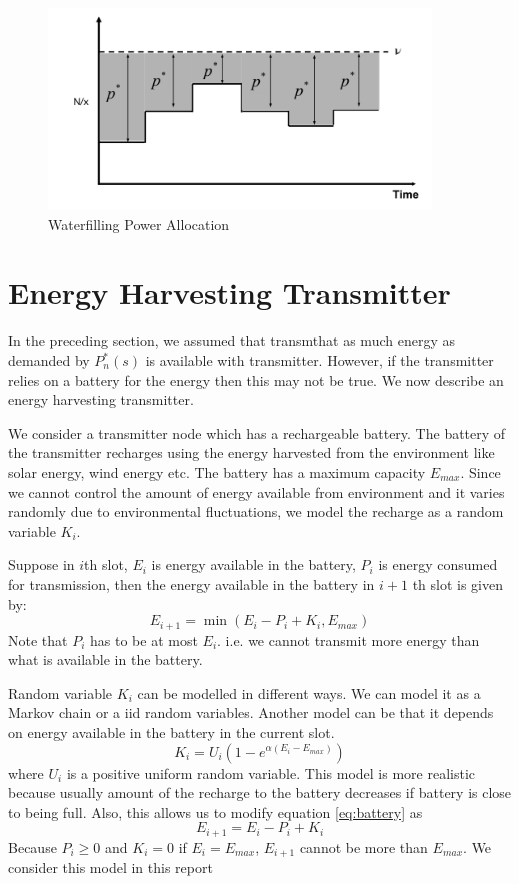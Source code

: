 \documentclass[a4paper,11pt]{article}
\begin{document}
\begin{figure}
\centering
\includegraphics[width = 4in]{waterfilling.png}
\caption{Waterfilling Power Allocation}
\label{fig:water}
\end{figure}

\section{Energy Harvesting Transmitter}
In the preceding section, we assumed that transmthat as much energy as demanded by $P_n^*(s)$ is available with transmitter. However, if the transmitter relies on a battery for the energy then this may not be true. We now describe an energy harvesting transmitter.

We consider a transmitter node which has a rechargeable battery. The battery of the transmitter recharges using the energy harvested from the environment like solar energy, wind energy etc. The battery has a maximum capacity $E_{max}$.
Since we cannot control the amount of energy available from environment and it varies randomly
due to environmental fluctuations, we model the recharge as a random variable $K_i$.

Suppose in $i$th slot, $E_i$ is energy available in the battery, $P_i$ is energy consumed for transmission, then the energy available in the battery in $i+1$ th slot is given by:
\begin{equation}
 E_{i+1} = \min(E_i - P_i + K_i,E_{max}) 
\label{eq:battery}
\end{equation}
Note that $P_i$ has to be at most $E_i$. i.e. we cannot transmit more energy than what is available in the battery.

Random variable $K_i$ can be modelled in different ways. We can model it as a Markov chain or a iid random variables.
Another model can be that it depends on energy available in the battery in the current slot. 
\[K_i = U_i(1 - e^{\alpha(E_i - E_{max}) })\] 
where $U_i$ is a positive uniform random variable.
This model is more realistic because usually amount of the recharge to the battery decreases if battery is close to being full. Also, this allows us to modify equation \ref{eq:battery} as 
\begin{equation}
 E_{i+1} = E_i - P_i + K_i 
\label{eq:bettery}
\end{equation}
Because $P_i \geq 0$ and $K_i = 0$ if $E_i = E_{max}$, $E_{i+1}$ cannot
be more than $E_{max}$.
We consider this model in this report
\end{document}
